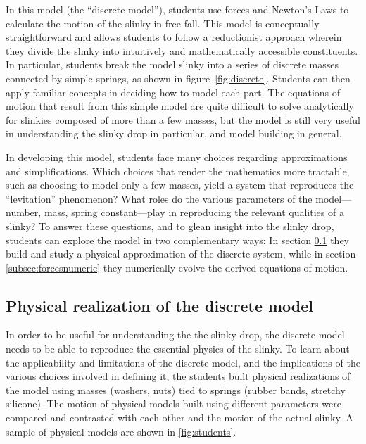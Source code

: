 \documentclass[prb,preprint,superscriptaddress]{revtex4-1}
\newcommand{\subsec}[1]{section~\ref{subsec:#1}}
\newcommand{\fig}[1]{figure~\ref{fig:#1}}
\begin{document}
In this model (the ``discrete model''), students use forces and Newton's Laws to calculate the
motion of the slinky in free fall. This
model is conceptually straightforward and allows students to follow a
reductionist approach wherein they divide the slinky into intuitively and mathematically accessible
constituents. In particular, students break the model slinky into a series of discrete masses connected by simple springs,
as shown in \fig{discrete}.
Students can then apply familiar concepts in deciding how to model each part. The equations of motion that result from this simple model are quite difficult to solve analytically for slinkies composed of more than a few masses, but the model is still very useful in understanding the slinky drop in particular, and model building in general. 

In developing this model, students face many choices regarding approximations and simplifications. Which choices that render the mathematics more tractable, such as choosing to model only a few masses, yield a system that reproduces the ``levitation'' phenomenon? What roles do the various parameters of the model---number, mass, spring constant---play in reproducing the relevant qualities of a slinky? To answer these questions, and to glean insight into the slinky drop, students can explore the model in two complementary ways: In section \ref{subsec:forcesexperiment} they build and study a physical approximation of the discrete system, while in section \ref{subsec:forcesnumeric} they numerically evolve the derived equations of motion.




\subsection{Physical realization of the discrete model}
\label{subsec:forcesexperiment}

In order to be useful for understanding the the slinky drop, the discrete model needs to be able to reproduce the essential physics of the slinky. To learn about the applicability and limitations of the discrete model, and the implications of the various choices involved in defining it, the students built physical realizations of the model using masses (washers, nuts) tied to springs (rubber bands, stretchy silicone). The motion of physical models built using different parameters were compared and contrasted with each other and the motion of the actual slinky. A sample of physical models are shown in \ref{fig:students}.  
\end{document}
